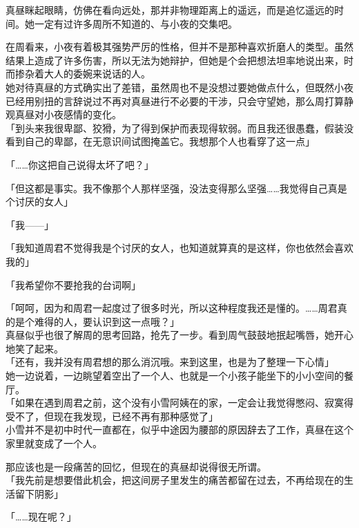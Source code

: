 真昼眯起眼睛，仿佛在看向远处，那并非物理距离上的遥远，而是追忆遥远的时间。她一定有过许多周所不知道的、与小夜的交集吧。

在周看来，小夜有着极其强势严厉的性格，但并不是那种喜欢折磨人的类型。虽然结果上造成了许多伤害，所以无法为她辩护，但她是个会把想法坦率地说出来，时而掺杂着大人的委婉来说话的人。\\

她对待真昼的方式确实出了差错，虽然周也不是没想过要她做点什么，但既然小夜已经用别扭的言辞说过不再对真昼进行不必要的干涉，只会守望她，那么周打算静观真昼对小夜感情的变化。\\

「到头来我很卑鄙、狡猾，为了得到保护而表现得软弱。而且我还很愚蠢，假装没看到自己的卑鄙，在无意识间试图掩盖它。我想那个人也看穿了这一点」

「……你这把自己说得太坏了吧？」

「但这都是事实。我不像那个人那样坚强，没法变得那么坚强……我觉得自己真是个讨厌的女人」

「我——」

「我知道周君不觉得我是个讨厌的女人，也知道就算真的是这样，你也依然会喜欢我的」

「我希望你不要抢我的台词啊」

「呵呵，因为和周君一起度过了很多时光，所以这种程度我还是懂的。……周君真的是个难得的人，要认识到这一点哦？」\\

真昼似乎也很了解周的思考回路，抢先了一步。看到周气鼓鼓地抿起嘴唇，她开心地笑了起来。\\

「还有，我并没有周君想的那么消沉哦。来到这里，也是为了整理一下心情」\\

她一边说着，一边眺望着空出了一个人、也就是一个小孩子能坐下的小小空间的餐厅。\\

「如果在遇到周君之前，这个没有小雪阿姨在的家，一定会让我觉得憋闷、寂寞得受不了，但现在我发现，已经不再有那种感觉了」\\

小雪并不是初中时代一直都在，似乎中途因为腰部的原因辞去了工作，真昼在这个家里就变成了一个人。

那应该也是一段痛苦的回忆，但现在的真昼却说得很无所谓。\\

「我先前是想要借此机会，把这间房子里发生的痛苦都留在过去，不再给现在的生活留下阴影」

「……现在呢？」

